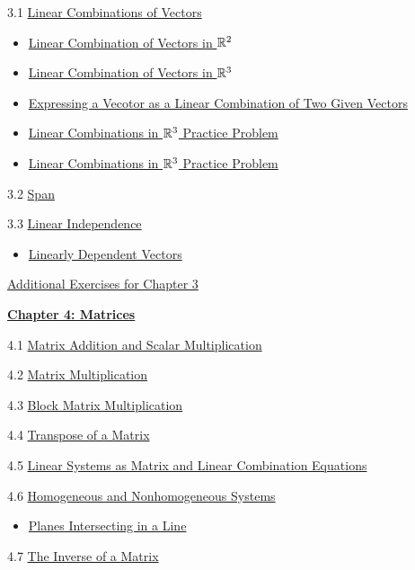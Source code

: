 \documentclass{ximera}
\begin{document}
3.1	\href{\xmbaseurl/VEC-0040/main}{Linear Combinations of Vectors}
\begin{itemize}
    \item 
    \href{https://www.geogebra.org/m/md3srgdg}{Linear Combination of Vectors in $\mathbb{R}^2$}
    \item
    \href{https://www.geogebra.org/m/zvzxujp2}{Linear Combination of Vectors in $\mathbb{R}^3$}
    \item
    \href{https://www.geogebra.org/m/u77b52k8}{Expressing a Vecotor as a Linear Combination of Two Given Vectors}
    \item
    \href{https://www.geogebra.org/m/kk5hwjka}{Linear Combinations in $\mathbb{R}^3$ Practice Problem}
    \item
    \href{https://www.geogebra.org/m/x9f6qnyr}{Linear Combinations in $\mathbb{R}^3$ Practice Problem}
\end{itemize}
	
3.2	\href{\xmbaseurl/VEC-0090/main}{Span}
	
3.3	\href{\xmbaseurl/VEC-0100/main}{Linear Independence}
\begin{itemize}
    \item 
    \href{https://www.geogebra.org/m/x72vbsaw}{Linearly Dependent Vectors}
\end{itemize}
	
\href{\xmbaseurl/SUPX-0030/main}{Additional Exercises for Chapter 3}
	
\href{\xmbaseurl/XLAChapter_matrices/main}{\textbf{Chapter 4: Matrices}}
	
4.1	\href{\xmbaseurl/MAT-0010/main}{Matrix Addition and Scalar Multiplication}
	
4.2	\href{\xmbaseurl/MAT-0020/main}{Matrix Multiplication}
	
4.3	\href{\xmbaseurl/MAT-0023/main}{Block Matrix Multiplication}
	
4.4	\href{\xmbaseurl/MAT-0025/main}{Transpose of a Matrix}
	
4.5	\href{\xmbaseurl/MAT-0030/main}{Linear Systems as Matrix and Linear Combination Equations}
	
4.6	\href{\xmbaseurl/SYS-0050/main}{Homogeneous and Nonhomogeneous Systems}
\begin{itemize}
    \item 
    \href{https://www.geogebra.org/m/gxjnusja}{Planes Intersecting in a Line}
\end{itemize}

4.7	\href{\xmbaseurl/MAT-0050/main}{The Inverse of a Matrix}
	
\end{document}

